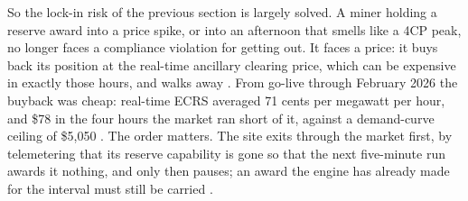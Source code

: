 So the lock-in risk of the previous section is largely solved. A miner holding a reserve award into a price spike, or into an afternoon that smells like a 4CP peak, no longer faces a compliance violation for getting out. It faces a price: it buys back its position at the real-time ancillary clearing price, which can be expensive in exactly those hours, and walks away \autocite{potomac2026somercot}. %
From go-live through February 2026 the buyback was cheap: real-time ECRS averaged 71 cents per megawatt per hour, and \$78 in the four hours the market ran short of it, against a demand-curve ceiling of \$5,050 \autocite{potomac2026somercot,ercotnodalrtc2025}. %
The order matters. The site exits through the market first, by telemetering that its reserve capability is gone so that the next five-minute run awards it nothing, and only then pauses; an award the engine has already made for the interval must still be carried \autocite{ercotrtcbloadres2025,ercot2026protocols}. %
